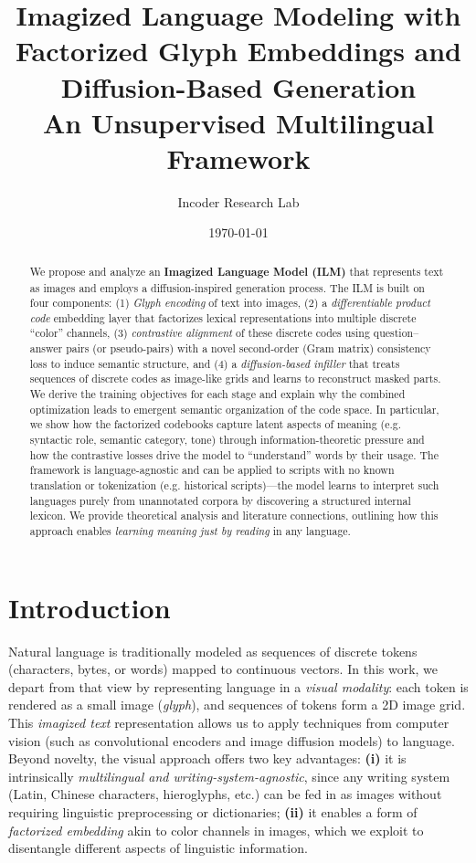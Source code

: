 \documentclass[10pt,twocolumn]{article}
\title{Imagized Language Modeling with Factorized Glyph Embeddings and Diffusion-Based Generation\\\large An Unsupervised Multilingual Framework}
\author{Incoder Research Lab}
\date{\today}
\begin{document}
\maketitle

\begin{abstract}
We propose and analyze an \textbf{Imagized Language Model (ILM)} that represents text as images and employs a diffusion-inspired generation process. The ILM is built on four components: (1) \emph{Glyph encoding} of text into images, (2) a \emph{differentiable product code} embedding layer that factorizes lexical representations into multiple discrete ``color'' channels, (3) \emph{contrastive alignment} of these discrete codes using question--answer pairs (or pseudo-pairs) with a novel second-order (Gram matrix) consistency loss to induce semantic structure, and (4) a \emph{diffusion-based infiller} that treats sequences of discrete codes as image-like grids and learns to reconstruct masked parts. We derive the training objectives for each stage and explain why the combined optimization leads to emergent semantic organization of the code space. In particular, we show how the factorized codebooks capture latent aspects of meaning (e.g. syntactic role, semantic category, tone) through information-theoretic pressure and how the contrastive losses drive the model to ``understand'' words by their usage. The framework is language-agnostic and can be applied to scripts with no known translation or tokenization (e.g. historical scripts)---the model learns to interpret such languages purely from unannotated corpora by discovering a structured internal lexicon. We provide theoretical analysis and literature connections, outlining how this approach enables \emph{learning meaning just by reading} in any language.
\end{abstract}

\section{Introduction}
Natural language is traditionally modeled as sequences of discrete tokens (characters, bytes, or words) mapped to continuous vectors. In this work, we depart from that view by representing language in a \emph{visual modality}: each token is rendered as a small image (\emph{glyph}), and sequences of tokens form a 2D image grid. This \emph{imagized text} representation allows us to apply techniques from computer vision (such as convolutional encoders and image diffusion models) to language. Beyond novelty, the visual approach offers two key advantages: \textbf{(i)} it is intrinsically \emph{multilingual and writing-system-agnostic}, since any writing system (Latin, Chinese characters, hieroglyphs, etc.) can be fed in as images without requiring linguistic preprocessing or dictionaries; \textbf{(ii)} it enables a form of \emph{factorized embedding} akin to color channels in images, which we exploit to disentangle different aspects of linguistic information.
\end{document}
